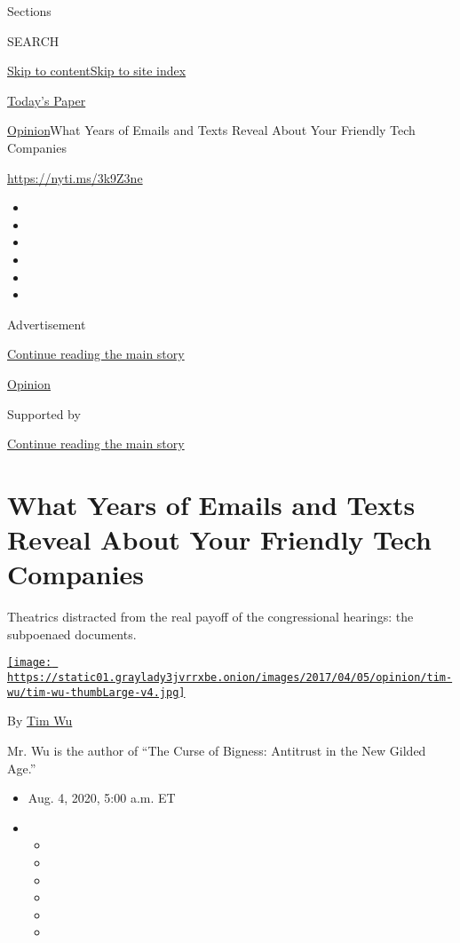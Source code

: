 Sections

SEARCH

\protect\hyperlink{site-content}{Skip to
content}\protect\hyperlink{site-index}{Skip to site index}

\href{https://myaccount.nytimes3xbfgragh.onion/auth/login?response_type=cookie\&client_id=vi}{}

\href{https://www.nytimes3xbfgragh.onion/section/todayspaper}{Today's
Paper}

\href{/section/opinion}{Opinion}\textbar{}What Years of Emails and Texts
Reveal About Your Friendly Tech Companies

\url{https://nyti.ms/3k9Z3ne}

\begin{itemize}
\item
\item
\item
\item
\item
\item
\end{itemize}

Advertisement

\protect\hyperlink{after-top}{Continue reading the main story}

\href{/section/opinion}{Opinion}

Supported by

\protect\hyperlink{after-sponsor}{Continue reading the main story}

\hypertarget{what-years-of-emails-and-texts-reveal-about-your-friendly-tech-companies}{%
\section{What Years of Emails and Texts Reveal About Your Friendly Tech
Companies}\label{what-years-of-emails-and-texts-reveal-about-your-friendly-tech-companies}}

Theatrics distracted from the real payoff of the congressional hearings:
the subpoenaed documents.

\href{https://www.nytimes3xbfgragh.onion/by/tim-wu}{\texttt{[image: https://static01.graylady3jvrrxbe.onion/images/2017/04/05/opinion/tim-wu/tim-wu-thumbLarge-v4.jpg]}}

By \href{https://www.nytimes3xbfgragh.onion/by/tim-wu}{Tim Wu}

Mr. Wu is the author of ``The Curse of Bigness: Antitrust in the New
Gilded Age.''

\begin{itemize}
\item
  Aug. 4, 2020, 5:00 a.m. ET
\item
  \begin{itemize}
  \item
  \item
  \item
  \item
  \item
  \item
  \end{itemize}
\end{itemize}

